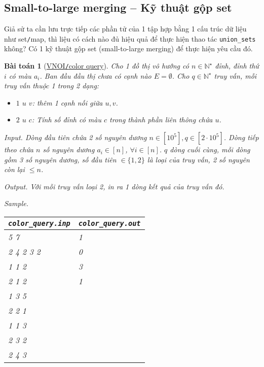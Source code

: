 \documentclass{article}
\newtheorem{baitoan}{Bài toán}
\begin{document}
\subsection{Small-to-large merging -- Kỹ thuật gộp set}
Giả sử ta cần lưu trực tiếp các phần tử của 1 tập hợp bằng 1 cấu trúc dữ liệu như set{\tt/}map, thì liệu có cách nào đủ hiệu quả để thực hiện thao tác \verb|union_sets| không? Có 1 kỹ thuật gộp set (small-to-large merging) để thực hiện yêu cầu đó.

\begin{baitoan}[\href{https://oj.vnoi.info/problem/colquery}{VNOI{\tt/}color query}]
    Cho 1 đồ thị vô hướng có $n\in\mathbb{N}^\star$ đỉnh, đỉnh thứ $i$ có màu $a_i$. Ban đầu đầu thị chưa có cạnh nào $E = \emptyset$. Cho $q\in\mathbb{N}^\star$ truy vấn, mỗi truy vấn thuộc 1 trong 2 dạng:
    \begin{itemize}
        \item $1$ $u$ $v$: thêm 1 cạnh nối giữa $u,v$.
        \item $2$ $u$ $c$: Tính số đỉnh có màu $c$ trong thành phần liên thông chứa $u$.
    \end{itemize}
    \item {\sf Input.} Dòng đầu tiên chứa 2 số nguyên dương $n\in[10^5],q\in[2\cdot10^5]$. Dòng tiếp theo chứa $n$ số nguyên dương $a_i\in[n]$, $\forall i\in[n]$. $q$ dòng cuối cùng, mỗi dòng gồm 3 số nguyên dương, số đầu tiên $\in\{1,2\}$ là loại của truy vấn, 2 số nguyên còn lại $\le n$.
    \item {\sf Output.} Với mỗi truy vấn loại 2, in ra 1 dòng kết quả của truy vấn đó.
    \item {\sf Sample.}
    \begin{table}[H]
        \centering
        \begin{tabular}{|l|l|}
            \hline
            \verb|color_query.inp| & \verb|color_query.out| \\
            \hline
            5 7 & 1 \\
            2 4 2 3 2 & 0 \\
            1 1 2 & 3 \\
            2 1 2 & 1 \\
            1 3 5 & \\
            2 2 1 & \\
            1 1 3 & \\
            2 3 2 & \\
            2 4 3 & \\
            \hline
        \end{tabular}
    \end{table}
\end{baitoan}
\end{document}

